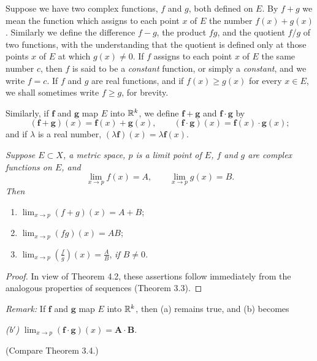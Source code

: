 Suppose we have two complex functions, $f$ and $g$, both defined on $E$. By
$f+g$ we mean the function which assigns to each point $x$ of $E$ the number
$f(x)+g(x)$. Similarly we define the difference $f-g$, the product $fg$, and
the quotient $f/g$ of two functions, with the understanding that the quotient
is defined only at those points $x$ of $E$ at which $g(x) \ne 0$. If $f$
assigns to each point $x$ of $E$ the same number $c$, then $f$ is said to be a
\emph{constant} function, or simply a \emph{constant}, and we write $f = c$.
If $f$ and $g$ are real functions, and if $f(x) \ge g(x)$ for every
$x \in E$, we shall sometimes write $f \ge g$, for brevity.

Similarly, if $\mathbf{f}$ and $\mathbf{g}$ map $E$ into $\mathbb{R}^k$, we define
$\mathbf{f}+\mathbf{g}$ and $\mathbf{f}\cdot\mathbf{g}$ by
\[ (\mathbf{f}+\mathbf{g})(x) = \mathbf{f}(x)+\mathbf{g}(x), \qquad
   (\mathbf{f}\cdot\mathbf{g})(x) = \mathbf{f}(x)\cdot\mathbf{g}(x); \]
and if $\lambda$ is a real number, $(\lambda\mathbf{f})(x) =
\lambda\mathbf{f}(x)$.

\emph{Suppose $E \subset X$, a metric space, $p$ is a limit point of $E$, $f$
and $g$ are complex functions on $E$, and}
\[ \lim_{x\to p} f(x) = A, \qquad \lim_{x\to p} g(x) = B. \]
\emph{Then}
\begin{enumerate}[label=(\alph*), leftmargin=2.2em, itemsep=2pt, topsep=3pt]
  \item $\displaystyle\lim_{x\to p} (f+g)(x) = A+B$;
  \item $\displaystyle\lim_{x\to p} (fg)(x) = AB$;
  \item $\displaystyle\lim_{x\to p} \left(\frac fg\right)(x) = \frac AB$,
        \emph{if $B \ne 0$.}
\end{enumerate}

\begin{proof}
In view of Theorem 4.2, these assertions follow immediately from the analogous
properties of sequences (Theorem 3.3).
\end{proof}

\emph{Remark:} If $\mathbf{f}$ and $\mathbf{g}$ map $E$ into $\mathbb{R}^k$, then (a)
remains true, and (b) becomes

\emph{(b$'$)} $\displaystyle\lim_{x\to p}
(\mathbf{f}\cdot\mathbf{g})(x) = \mathbf{A}\cdot\mathbf{B}$.

(Compare Theorem 3.4.)
